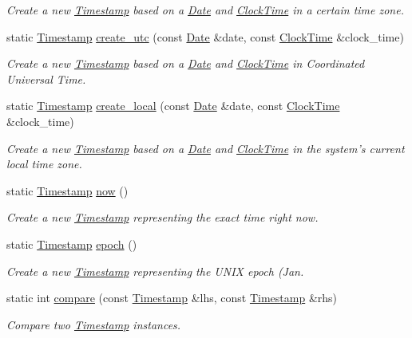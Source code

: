 \begin{DoxyCompactItemize}
\begin{DoxyCompactList}\small\item\em Create a new \hyperlink{structTimestamp}{Timestamp} based on a \hyperlink{structDate}{Date} and \hyperlink{structClockTime}{Clock\-Time} in a certain time zone. \end{DoxyCompactList}\item 
static \hyperlink{structTimestamp}{Timestamp} \hyperlink{structTimestamp_a055a8725134dace86cf5a017469f5def}{create\-\_\-utc} (const \hyperlink{structDate}{Date} \&date, const \hyperlink{structClockTime}{Clock\-Time} \&clock\-\_\-time)
\begin{DoxyCompactList}\small\item\em Create a new \hyperlink{structTimestamp}{Timestamp} based on a \hyperlink{structDate}{Date} and \hyperlink{structClockTime}{Clock\-Time} in Coordinated Universal Time. \end{DoxyCompactList}\item 
static \hyperlink{structTimestamp}{Timestamp} \hyperlink{structTimestamp_a7601075ef85b132115e733cddc747675}{create\-\_\-local} (const \hyperlink{structDate}{Date} \&date, const \hyperlink{structClockTime}{Clock\-Time} \&clock\-\_\-time)
\begin{DoxyCompactList}\small\item\em Create a new \hyperlink{structTimestamp}{Timestamp} based on a \hyperlink{structDate}{Date} and \hyperlink{structClockTime}{Clock\-Time} in the system's current local time zone. \end{DoxyCompactList}\item 
static \hyperlink{structTimestamp}{Timestamp} \hyperlink{structTimestamp_ab2b17140c0c966ad672395f3f90b8653}{now} ()
\begin{DoxyCompactList}\small\item\em Create a new \hyperlink{structTimestamp}{Timestamp} representing the exact time right now. \end{DoxyCompactList}\item 
static \hyperlink{structTimestamp}{Timestamp} \hyperlink{structTimestamp_aa2f108710dbe1372d8fc7146a2e66c37}{epoch} ()
\begin{DoxyCompactList}\small\item\em Create a new \hyperlink{structTimestamp}{Timestamp} representing the U\-N\-I\-X epoch (Jan. \end{DoxyCompactList}\item 
static int \hyperlink{structTimestamp_a64216c9061a4449c8d3fb9d1fecbb4a0}{compare} (const \hyperlink{structTimestamp}{Timestamp} \&lhs, const \hyperlink{structTimestamp}{Timestamp} \&rhs)
\begin{DoxyCompactList}\small\item\em Compare two \hyperlink{structTimestamp}{Timestamp} instances. \end{DoxyCompactList}\end{DoxyCompactItemize}
